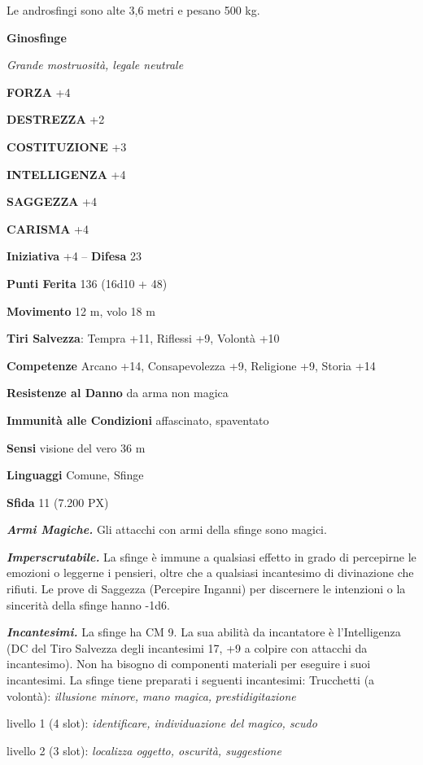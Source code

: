 \begin{multicols}{2}
Le androsfingi sono alte 3,6 metri e pesano 500 kg.


\medskip{}\textbf{Ginosfinge}

\textit{Grande mostruosità, legale neutrale}

\textbf{FORZA} +4

\textbf{DESTREZZA} +2

\textbf{COSTITUZIONE} +3

\textbf{INTELLIGENZA} +4

\textbf{SAGGEZZA} +4

\textbf{CARISMA} +4

\textbf{Iniziativa} +4 -- \textbf{Difesa} 23

\textbf{Punti Ferita} 136 (16d10 + 48)

\textbf{Movimento} 12 m, volo 18 m

\textbf{Tiri Salvezza}: Tempra +11, Riflessi +9, Volontà +10

\textbf{Competenze} Arcano +14, Consapevolezza +9, Religione +9, Storia +14

\textbf{Resistenze al Danno} da arma non magica

\textbf{Immunità alle Condizioni} affascinato, spaventato

\textbf{Sensi} visione del vero 36 m

\textbf{Linguaggi} Comune, Sfinge

\textbf{Sfida} 11 (7.200 PX)

\textit{\textbf{Armi Magiche.}} Gli attacchi con armi della sfinge sono magici.

\textit{\textbf{Imperscrutabile.}} La sfinge è immune a qualsiasi effetto in grado di percepirne le emozioni o leggerne i pensieri, oltre che a qualsiasi incantesimo di divinazione che rifiuti. Le prove di Saggezza (Percepire Inganni) per discernere le intenzioni o la sincerità della sfinge hanno -1d6.

\textit{\textbf{Incantesimi.}} La sfinge ha CM 9. La sua abilità da incantatore è l'Intelligenza (DC del Tiro Salvezza degli incantesimi 17, +9 a colpire con attacchi da incantesimo). Non ha bisogno di componenti materiali per eseguire i suoi incantesimi. La sfinge tiene preparati i seguenti incantesimi: Trucchetti (a volontà): \textit{illusione minore, mano magica,} \textit{prestidigitazione}

livello 1 (4 slot): \textit{identificare, individuazione del magico, scudo}

livello 2 (3 slot): \textit{localizza oggetto, oscurità, suggestione}


\end{multicols}
